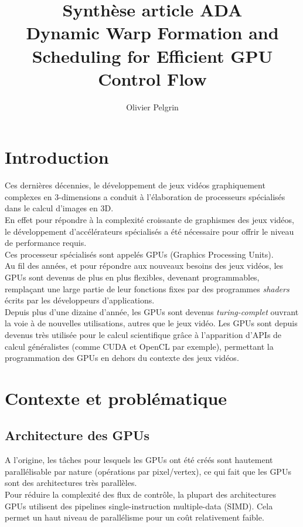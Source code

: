 \documentclass[11pt]{article}
\begin{document}
\title{\textbf{Synthèse article ADA} \\Dynamic Warp Formation and Scheduling for Efficient GPU Control Flow
}
\author{Olivier Pelgrin}


\maketitle

\section{Introduction}

Ces dernières décennies, le développement de jeux vidéos graphiquement complexes en 3-dimensions a conduit à l'élaboration de processeurs spécialisés dans le calcul d'images en 3D.
\\En effet pour répondre à la complexité croissante de graphismes des jeux vidéos, le développement d'accélérateurs spécialisés a été nécessaire pour offrir le niveau de performance requis.
\\Ces processeur spécialisés sont appelés GPUs (Graphics Processing Units).
\\Au fil des années, et pour répondre aux nouveaux besoins des jeux vidéos, les GPUs sont devenus de plus en plus flexibles, devenant programmables, remplaçant une large partie de leur fonctions fixes par des programmes \emph{shaders} écrits par les développeurs d'applications.
\\Depuis plus d'une dizaine d'année, les GPUs sont devenus \emph{turing-complet} ouvrant la voie à de nouvelles utilisations, autres que le jeux vidéo.
Les GPUs sont depuis devenus très utilisée pour le calcul scientifique grâce à l'apparition d'APIs de calcul généralistes (comme CUDA et OpenCL par exemple), permettant la programmation des GPUs en dehors du contexte des jeux vidéos.

\newpage

\section{Contexte et problématique}

\subsection{Architecture des GPUs}

A l'origine, les tâches pour lesquels les GPUs ont été créés sont hautement parallélisable par nature (opérations par pixel/vertex), ce qui fait que les GPUs sont des architectures très parallèles.
\\Pour réduire la complexité des flux de contrôle, la plupart des architectures GPUs utilisent des pipelines single-instruction multiple-data (SIMD). Cela permet un haut niveau de parallélisme pour un coût relativement faible.
\end{document}
